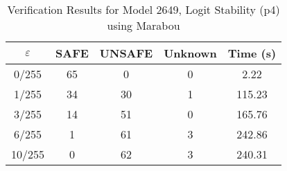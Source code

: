 \begin{table}[htbp]
\centering
\caption{Verification Results for Model 2649, Logit Stability (p4) using Marabou}
\label{tab:model2649_p4_marabou}
\begin{tabular}{|c|c|c|c|c|}
\hline
$\varepsilon$ & SAFE & UNSAFE & Unknown & Time (s) \\ \hline
0/255 & 65 & 0 & 0 & 2.22 \\ \hline
1/255 & 34 & 30 & 1 & 115.23 \\ \hline
3/255 & 14 & 51 & 0 & 165.76 \\ \hline
6/255 & 1 & 61 & 3 & 242.86 \\ \hline
10/255 & 0 & 62 & 3 & 240.31 \\ \hline
\end{tabular}
\end{table}
